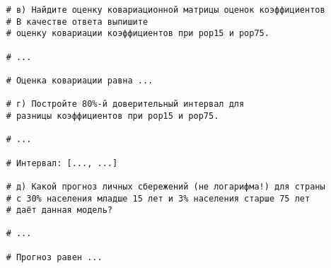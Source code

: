 \documentclass[12pt]{article}
\begin{document}
\begin{enumerate}
\begin{verbatim}
    # в) Найдите оценку ковариационной матрицы оценок коэффициентов
    # В качестве ответа выпишите  
    # оценку ковариации коэффициентов при pop15 и pop75.

    # ... 

    # Оценка ковариации равна ...

    # г) Постройте 80%-й доверительный интервал для 
    # разницы коэффициентов при pop15 и pop75.

    # ...

    # Интервал: [..., ...]

    # д) Какой прогноз личных сбережений (не логарифма!) для страны 
    # с 30% населения младше 15 лет и 3% населения старше 75 лет 
    # даёт данная модель?
    
    # ...

    # Прогноз равен ...
\end{verbatim}



\end{enumerate}
\end{document}
